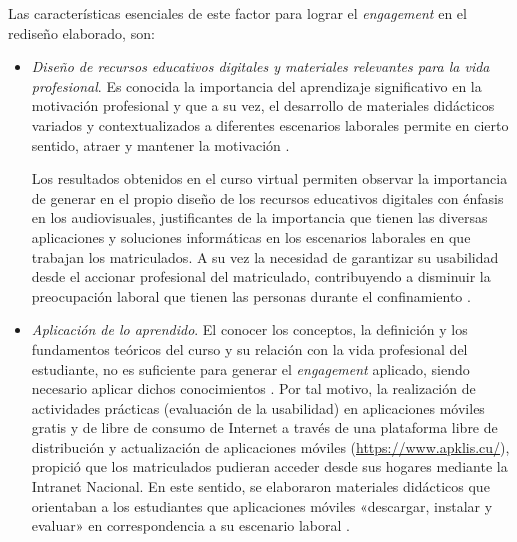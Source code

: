 \documentclass[spanish]{textolivre}
\begin{document}
Las características esenciales de este factor para lograr el \emph{engagement} en el rediseño elaborado, son:

\begin{itemize}
    \item \emph{Diseño de recursos educativos digitales y materiales relevantes para la vida profesional}. Es conocida la importancia del aprendizaje significativo en la motivación profesional \cite{brown2017} %
    y que a su vez, el desarrollo de materiales didácticos variados y contextualizados a diferentes escenarios laborales permite en cierto sentido, atraer y mantener la motivación \cite{elmaadaway2017}.%
    
    Los resultados obtenidos en el curso virtual permiten observar la importancia de generar en el propio diseño de los recursos educativos digitales con énfasis en los audiovisuales, justificantes de la importancia que tienen las diversas aplicaciones y soluciones informáticas en los escenarios laborales en que trabajan los matriculados. A su vez la necesidad de garantizar su usabilidad desde el accionar profesional del matriculado, contribuyendo a disminuir la preocupación laboral que tienen las personas durante el confinamiento \cite{amaya2021, hernandezramos2021}. %
    
    \item \emph{Aplicación de lo aprendido}. El conocer los conceptos, la definición y los fundamentos teóricos del curso y su relación con la vida profesional del estudiante, no es suficiente para generar el \emph{engagement} aplicado, siendo necesario aplicar dichos conocimientos \cite{mohd2020}. %
    Por tal motivo, la realización de actividades prácticas (evaluación de la usabilidad) en aplicaciones móviles gratis y de libre de consumo de Internet a través de una plataforma libre de distribución y actualización de aplicaciones móviles (\url{https://www.apklis.cu/}), propició que los matriculados pudieran acceder desde sus hogares mediante la Intranet Nacional. En este sentido, se elaboraron materiales didácticos que orientaban a los estudiantes que aplicaciones móviles «descargar, instalar y evaluar» en correspondencia a su escenario laboral \cite{brown2017, elmaadaway2017, davis2018, buchele2020}. %

\end{itemize}
\end{document}
